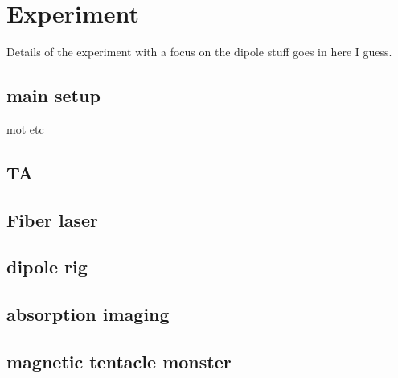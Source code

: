 \chapter{Experiment}

Details of the experiment with a focus on the dipole stuff goes in here I guess.

\section{main setup}

mot etc

\section{TA}

\section{Fiber laser}

\section{dipole rig}

\section{absorption imaging}

\section{magnetic tentacle monster}


